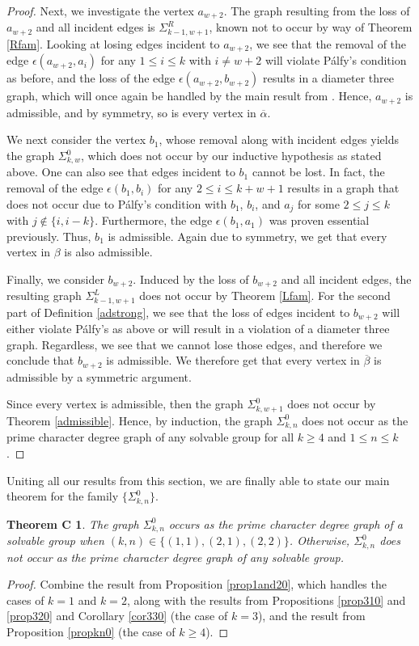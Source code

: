 \documentclass[11pt]{amsart}
\newtheorem*{thmC}{Theorem C}
\theoremstyle{definition}
\theoremstyle{remark}
\numberwithin{equation}{section}
\newcommand{\SL}[2]{\Sigma_{#1,#2}^L} %
\newcommand{\SR}[2]{\Sigma_{#1,#2}^R} %
\newcommand{\SZ}[2]{\Sigma_{#1,#2}^0} %
\begin{document}
\begin{proof}
Next, we investigate the vertex $a_{w+2}$. The graph resulting from the loss of $a_{w+2}$ and all incident edges is $\SR{k-1}{w+1}$, known not to occur by way of Theorem \ref{Rfam}. Looking at losing edges incident to $a_{w+2}$, we see that the removal of the edge $\epsilon(a_{w+2},a_i)$ for any $1\leq i\leq k$ with $i\neq w+2$ will violate P\'alfy's condition as before, and the loss of the edge $\epsilon(a_{w+2},b_{w+2})$ results in a diameter three graph, which will once again be handled by the main result from \cite{S}. Hence, $a_{w+2}$ is admissible, and by symmetry, so is every vertex in $\overline{\alpha}$.

We next consider the vertex $b_1$, whose removal along with incident edges yields the graph $\SZ{k}{w}$, which does not occur by our inductive hypothesis as stated above. One can also see that edges incident to $b_1$ cannot be lost. In fact, the removal of the edge $\epsilon(b_1,b_i)$ for any $2\leq i\leq k+w+1$ results in a graph that does not occur due to P\'alfy's condition with $b_1$, $b_i$, and $a_j$ for some $2\leq j\leq k$ with $j \not\in\{i,i-k\}$. Furthermore, the edge $\epsilon(b_1,a_1)$ was proven essential previously. Thus, $b_1$ is admissible. Again due to symmetry, we get that every vertex in $\beta$ is also admissible.

Finally, we consider $b_{w+2}$. Induced by the loss of $b_{w+2}$ and all incident edges, the resulting graph $\SL{k-1}{w+1}$ does not occur by Theorem \ref{Lfam}. For the second part of Definition \ref{adstrong}, we see that the loss of edges incident to $b_{w+2}$ will either violate P\'alfy's as above or will result in a violation of a diameter three graph. Regardless, we see that we cannot lose those edges, and therefore we conclude that $b_{w+2}$ is admissible. We therefore get that every vertex in $\overline{\beta}$ is admissible by a symmetric argument.

Since every vertex is admissible, then the graph $\SZ{k}{w+1}$ does not occur by Theorem \ref{admissible}. Hence, by induction, the graph $\SZ{k}{n}$ does not occur as the prime character degree graph of any solvable group for all $k\geq4$ and $1\leq n\leq k$.
\end{proof}

Uniting all our results from this section, we are finally able to state our main theorem for the family $\{\SZ{k}{n}\}$.

\begin{thmC}
The graph $\SZ{k}{n}$ occurs as the prime character degree graph of a solvable group when $(k,n)\in\{(1,1), (2,1), (2,2)\}$. Otherwise, $\SZ{k}{n}$ does not occur as the prime character degree graph of any solvable group.
\end{thmC}
\begin{proof}
Combine the result from Proposition \ref{prop1and20}, which handles the cases of $k=1$ and $k=2$, along with the results from Propositions \ref{prop310} and \ref{prop320} and Corollary \ref{cor330} (the case of $k=3$), and the result from Proposition \ref{propkn0} (the case of $k\geq4$).
\end{proof}
\end{document}
